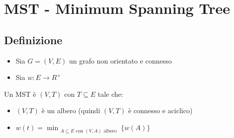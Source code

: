 \chapter{MST - Minimum Spanning Tree}

\section{Definizione}
\begin{itemize}
    \item Sia $G = (V,E)$ un grafo non orientato e connesso
    \item Sia $w : E \to R^+$
\end{itemize}

Un MST è $(V,T)$ con $T \subseteq E$ tale che:
\begin{itemize}
    \item $(V,T)$ è un albero (quindi $(V,T)$ è connesso e aciclico)
    \item $w(t) = \min_{\substack{A \subseteq E \text{ con } (V,A) \text{ albero}}}\{w(A)\}$
\end{itemize}

